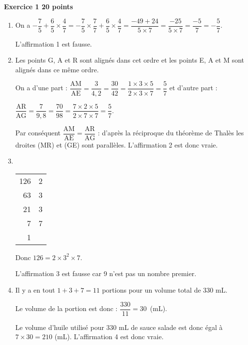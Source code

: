 \textbf{\large Exercice 1 \hfill 20 points}

\medskip

\begin{enumerate}
\item On a $- \dfrac75 +  \dfrac65 \times \dfrac47  = - \dfrac75 \times \dfrac77 + \dfrac65 \times \dfrac47 = \dfrac{- 49 + 24}{5\times 7} = \dfrac{- 25}{5\times 7} = \dfrac{- 5}{7} = - \dfrac{5}{7}$.

L'affirmation 1 est fausse.
\item Les points G, A et R sont alignés dans cet ordre et les points E, A et M sont alignés dans ce même ordre.

On a d'une part : $\dfrac{\text{AM}}{\text{AE}} = \dfrac{3}{4,2} = \dfrac{30}{42} = \dfrac{1 \times 3 \times 5}{2 \times 3 \times 7} = \dfrac57$ et d'autre part :

$\dfrac{\text{AR}}{\text{AG}} = \dfrac{7}{9,8} = \dfrac{70}{98} = \dfrac{7 \times 2 \times 5}{2 \times 7 \times 7} = \dfrac57$.

Par conséquent $\dfrac{\text{AM}}{\text{AE}} = \dfrac{\text{AR}}{\text{AG}}$ :  d'après la réciproque du théorème de Thalès les droites (MR) et (GE) sont parallèles. L'affirmation 2 est donc vraie.
\item ~

\begin{minipage}{0.3\linewidth}
\begin{tabular}{r|r}
126 &2\\
63 &3\\
21& 3\\
7&7\\
1&\\
\end{tabular}
\end{minipage}\hfill
\begin{minipage}{0.65\linewidth}
Donc $126 = 2 \times 3^2 \times 7$.
\end{minipage}

L'affirmation 3 est fausse car 9 n'est pas un nombre premier.
\item  Il y a en tout $1+3+7 =11$ portions pour un volume total de 330 mL.

Le volume de la portion est donc : $\dfrac{330}{11} = 30$~(mL).

Le volume d'huile utilisé pour $330$ mL de sauce salade est donc égal à $7 \times  30 =210$ (mL). L'affirmation 4 est donc vraie.

\end{enumerate}

\bigskip

